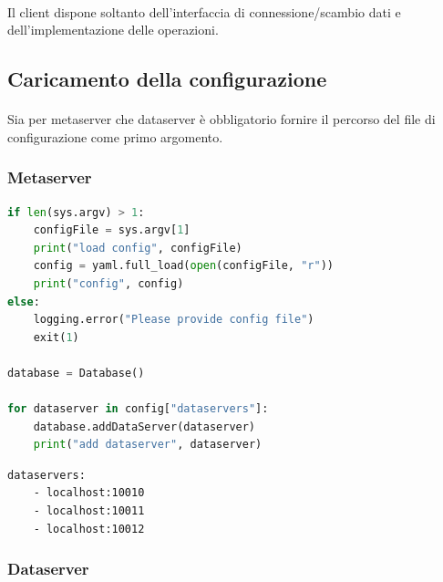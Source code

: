 \documentclass[11pt,a4paper,english]{article}
\begin{document}
\paragraph{} Il client dispone soltanto dell'interfaccia di connessione/scambio dati e dell'implementazione delle operazioni. 

\subsection{Caricamento della configurazione}

\paragraph{} Sia per metaserver che dataserver è obbligatorio fornire il percorso del file di configurazione come primo argomento. 

\subsubsection{Metaserver}

\begin{lstlisting}[language=Python, title=Codice]
if len(sys.argv) > 1:
	configFile = sys.argv[1]
	print("load config", configFile)
	config = yaml.full_load(open(configFile, "r"))
	print("config", config)
else:
	logging.error("Please provide config file")
	exit(1)

database = Database()

for dataserver in config["dataservers"]:
	database.addDataServer(dataserver)
	print("add dataserver", dataserver)
\end{lstlisting}

\begin{lstlisting}[title=Esempio di configurazione]
dataservers:
	- localhost:10010
	- localhost:10011
	- localhost:10012
\end{lstlisting}

\subsubsection{Dataserver}
\end{document}
